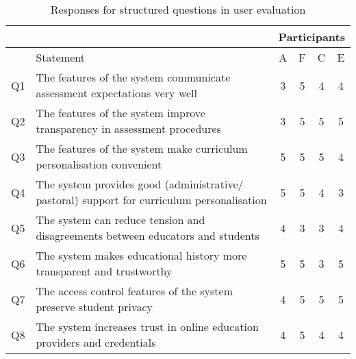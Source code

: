 \begin{table}[!ht]
	\caption{Responses for structured questions in user evaluation}
	\centering
	\label{table:structuredresp_eval}
    \begin{tabularx}{\textwidth}{|c|X|c|c|c|c|}
        \hline
        & & \multicolumn{4}{c}{Participants}\\
		\hline
		   & Statement                                                                                  & A                        & F                      & C                        & E                        \\
		\hline
		Q1 & The features of the system communicate assessment expectations very well                   & \cellcolor{Dandelion}3   & \cellcolor{green}5     & \cellcolor{SpringGreen}4 & \cellcolor{SpringGreen}4 \\
		\hline
		Q2 & The features of the system improve transparency in assessment procedures                   & \cellcolor{Dandelion}3   & \cellcolor{green}5     & \cellcolor{green}5       & \cellcolor{green}5       \\
		\hline
		Q3 & The features of the system make curriculum personalisation convenient                      & \cellcolor{green}5       & \cellcolor{green}5     & \cellcolor{green}5       & \cellcolor{SpringGreen}4 \\
		\hline
		Q4 & The system provides good (administrative/ pastoral) support for curriculum personalisation & \cellcolor{green}5       & \cellcolor{green}5     & \cellcolor{SpringGreen}4       & \cellcolor{Dandelion}3   \\
		\hline
		Q5 & The system can reduce tension and disagreements between educators and students             & \cellcolor{SpringGreen}4 & \cellcolor{Dandelion}3 & \cellcolor{Dandelion}3   & \cellcolor{SpringGreen}4 \\
		\hline
		Q6 & The system makes educational history more transparent and trustworthy                      & \cellcolor{green}5       & \cellcolor{green}5     & \cellcolor{Dandelion}3   & \cellcolor{green}5       \\
		\hline
		Q7 & The access control features of the system preserve student privacy                         & \cellcolor{SpringGreen}4 & \cellcolor{green}5     & \cellcolor{green}5       & \cellcolor{green}5       \\
		\hline
		Q8 & The system increases trust in online education providers and credentials                   & \cellcolor{SpringGreen}4 & \cellcolor{green}5     & \cellcolor{SpringGreen}4 & \cellcolor{SpringGreen}4 \\
		\hline
	\end{tabularx}
\end{table}

